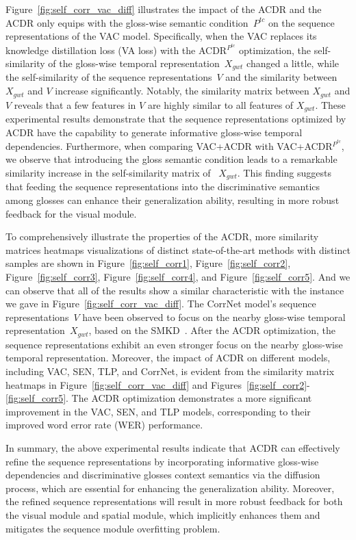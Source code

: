 \documentclass[sigconf]{acmart}
\begin{document}
Figure~\ref{fig:self_corr_vac_diff} illustrates the impact of the ACDR and the ACDR only equips with the gloss-wise semantic condition~$P^{tc}$ on the sequence representations of the VAC model. 
Specifically, when the VAC replaces its knowledge distillation loss (VA loss) with the ACDR$^{P^{tc}}$ optimization, the self-similarity of the gloss-wise temporal representation~$X_{gwt}$ changed a little, while the self-similarity of the sequence representations~$V$ and the similarity between $X_{gwt}$ and $V$ increase significantly. 
Notably, the similarity matrix between $X_{gwt}$ and $V$ reveals that a few features in $V$ are highly similar to all features of $X_{gwt}$.
These experimental results demonstrate that the sequence representations optimized by ACDR have the capability to generate informative gloss-wise temporal dependencies. 
Furthermore, when comparing VAC+ACDR with VAC+ACDR$^{P^{tc}}$, we observe that introducing the gloss semantic condition leads to a remarkable similarity increase in the self-similarity matrix of ~$X_{gwt}$. This finding suggests that feeding the sequence representations into the discriminative semantics among glosses can enhance their generalization ability, resulting in more robust feedback for the visual module.

To comprehensively illustrate the properties of the ACDR, more similarity matrices heatmaps visualizations of distinct state-of-the-art methods with distinct samples are shown in Figure~\ref{fig:self_corr1}, Figure~\ref{fig:self_corr2}, Figure~\ref{fig:self_corr3}, Figure~\ref{fig:self_corr4}, and Figure~\ref{fig:self_corr5}.
And we can observe that all of the results show a similar characteristic with the instance we gave in Figure~\ref{fig:self_corr_vac_diff}.
The CorrNet model's sequence representations~$V$ have been observed to focus on the nearby gloss-wise temporal representation~$X_{gwt}$, based on the SMKD~\cite{hao2021self}. After the ACDR optimization, the sequence representations exhibit an even stronger focus on the nearby gloss-wise temporal representation.
Moreover, the impact of ACDR on different models, including VAC, SEN, TLP, and CorrNet, is evident from the similarity matrix heatmaps in Figure~\ref{fig:self_corr_vac_diff} and Figures~\ref{fig:self_corr2}-\ref{fig:self_corr5}. The ACDR optimization demonstrates a more significant improvement in the VAC, SEN, and TLP models, corresponding to their improved word error rate (WER) performance.

In summary, the above experimental results indicate that ACDR can effectively refine the sequence representations by incorporating informative gloss-wise dependencies and discriminative glosses context semantics via the diffusion process, which are essential for enhancing the generalization ability. 
Moreover, the refined sequence representations will result in more robust feedback for both the visual module and spatial module, which implicitly enhances them and mitigates the sequence module overfitting problem.
\end{document}
